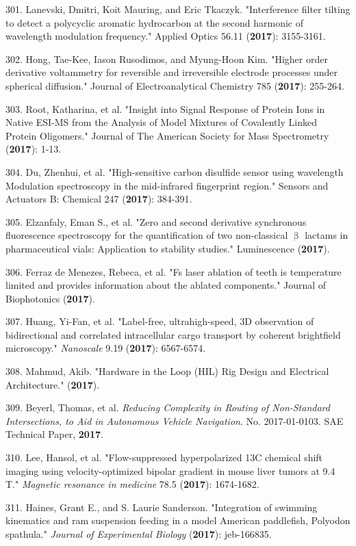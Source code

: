 301. Lanevski, Dmitri, Koit Mauring, and Eric Tkaczyk. "Interference filter tilting to detect a polycyclic aromatic hydrocarbon at the second harmonic of wavelength modulation frequency." Applied Optics 56.11 (\textbf{2017}): 3155-3161.

302. Hong, Tae-Kee, Iason Rusodimos, and Myung-Hoon Kim. "Higher order derivative voltammetry for reversible and irreversible electrode processes under spherical diffusion." Journal of Electroanalytical Chemistry 785 (\textbf{2017}): 255-264.

303. Root, Katharina, et al. "Insight into Signal Response of Protein Ions in Native ESI-MS from the Analysis of Model Mixtures of Covalently Linked Protein Oligomers." Journal of The American Society for Mass Spectrometry (\textbf{2017}): 1-13.

304. Du, Zhenhui, et al. "High-sensitive carbon disulfide sensor using wavelength Modulation spectroscopy in the mid-infrared fingerprint region." Sensors and Actuators B: Chemical 247 (\textbf{2017}): 384-391.

305. Elzanfaly, Eman S., et al. "Zero and second derivative synchronous fluorescence spectroscopy for the quantification of two non-classical ${\upbeta}$ lactams in pharmaceutical vials: Application to stability studies." Luminescence (\textbf{2017}).

306. Ferraz de Menezes, Rebeca, et al. "Fs laser ablation of teeth is temperature limited and provides information about the ablated components." Journal of Biophotonics (\textbf{2017}).

307. Huang, Yi-Fan, et al. "Label-free, ultrahigh-speed, 3D observation of bidirectional and correlated intracellular cargo transport by coherent brightfield microscopy." \textit{Nanoscale} 9.19 (\textbf{2017}): 6567-6574.

308. Mahmud, Akib. "Hardware in the Loop (HIL) Rig Design and Electrical Architecture." (\textbf{2017}). 

309. Beyerl, Thomas, et al. \textit{Reducing Complexity in Routing of Non-Standard Intersections, to Aid in Autonomous Vehicle Navigation}. No. 2017-01-0103. SAE Technical Paper, \textbf{2017}.

310. Lee, Hansol, et al. "Flow-suppressed hyperpolarized 13C chemical shift imaging using velocity-optimized bipolar gradient in mouse liver tumors at 9.4 T." \textit{Magnetic resonance in medicine} 78.5 (\textbf{2017}): 1674-1682.

311. Haines, Grant E., and S. Laurie Sanderson. "Integration of swimming kinematics and ram suspension feeding in a model American paddlefish, Polyodon spathula." \textit{Journal of Experimental Biology} (\textbf{2017}): jeb-166835.

